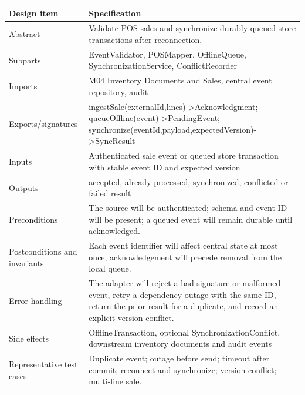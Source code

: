 {\def\LTcaptype{none} %
\begin{longtable}[]{|
  >{\raggedright\arraybackslash}m{}|
  >{\raggedright\arraybackslash}m{}|}
\hline
\begin{minipage}[c]{\linewidth}\raggedright
\textbf{Design item}
\end{minipage} & \begin{minipage}[c]{\linewidth}\raggedright
\textbf{Specification}
\end{minipage} \\
\hline
\endhead

\endlastfoot
Abstract & Validate POS sales and synchronize durably queued store transactions after reconnection. \\ \hline
Subparts & EventValidator, POSMapper, OfflineQueue, SynchronizationService, ConflictRecorder \\ \hline
Imports & M04 Inventory Documents and Sales, central event repository, audit \\ \hline
Exports/signatures & ingestSale(externalId,lines)-\textgreater Acknowledgment; queueOffline(event)-\textgreater PendingEvent; synchronize(eventId,payload,expectedVersion)-\textgreater SyncResult \\ \hline
Inputs & Authenticated sale event or queued store transaction with stable event ID and expected version \\ \hline
Outputs & accepted, already processed, synchronized, conflicted or failed result \\ \hline
Preconditions & The source will be authenticated; schema and event ID will be present; a queued event will remain durable until acknowledged. \\ \hline
Postconditions and invariants & Each event identifier will affect central state at most once; acknowledgement will precede removal from the local queue. \\ \hline
Error handling & The adapter will reject a bad signature or malformed event, retry a dependency outage with the same ID, return the prior result for a duplicate, and record an explicit version conflict. \\ \hline
Side effects & OfflineTransaction, optional SynchronizationConflict, downstream inventory documents and audit events \\ \hline
Representative test cases & Duplicate event; outage before send; timeout after commit; reconnect and synchronize; version conflict; multi-line sale. \\ \hline
\end{longtable}
}

